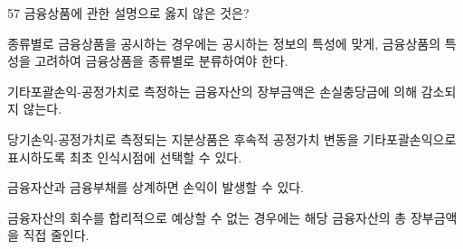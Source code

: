 \begin{question}{57}
금융상품에 관한 설명으로 옳지 않은 것은?
\begin{choices}
  \item 종류별로 금융상품을 공시하는 경우에는 공시하는 정보의 특성에 맞게, 금융상품의 특성을 고려하여 금융상품을 종류별로 분류하여야 한다.
  \item 기타포괄손익-공정가치로 측정하는 금융자산의 장부금액은 손실충당금에 의해 감소되지 않는다.
  \item 당기손익-공정가치로 측정되는 지분상품은 후속적 공정가치 변동을 기타포괄손익으로 표시하도록 최초 인식시점에 선택할 수 있다.
  \item 금융자산과 금융부채를 상계하면 손익이 발생할 수 있다.
  \item 금융자산의 회수를 합리적으로 예상할 수 없는 경우에는 해당 금융자산의 총 장부금액을 직접 줄인다.
\end{choices}
\end{question}

